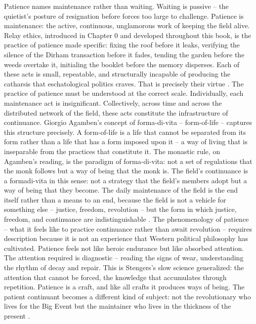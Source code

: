 Patience names maintenance rather than waiting. Waiting is passive – the quietist’s posture of resignation before forces too large to challenge. Patience is maintenance: the active, continuous, unglamorous work of keeping the field alive. Relay ethics, introduced in Chapter 0 and developed throughout this book, is the practice of patience made specific: fixing the roof before it leaks, verifying the silence of the Dirham transaction before it fades, tending the garden before the weeds overtake it, initialing the booklet before the memory disperses. Each of these acts is small, repeatable, and structurally incapable of producing the catharsis that eschatological politics craves. That is precisely their virtue \cite{stengers_2018}. The practice of patience must be understood at the correct scale. Individually, each maintenance act is insignificant. Collectively, across time and across the distributed network of the field, these acts constitute the infrastructure of continuance. Giorgio Agamben’s concept of forma-di-vita – form-of-life – captures this structure precisely. A form-of-life is a life that cannot be separated from its form rather than a life that has a form imposed upon it – a way of living that is inseparable from the practices that constitute it. The monastic rule, on Agamben’s reading, is the paradigm of forma-di-vita: not a set of regulations that the monk follows but a way of being that the monk is. The field’s continuance is a formadi-vita in this sense: not a strategy that the field’s members adopt but a way of being that they become. The daily maintenance of the field is the end itself rather than a means to an end, because the field is not a vehicle for something else – justice, freedom, revolution – but the form in which justice, freedom, and continuance are indistinguishable \cite[pp.~237-250]{agamben_2013}. The phenomenology of patience – what it feels like to practice continuance rather than await revolution – requires description because it is not an experience that Western political philosophy has cultivated. Patience feels not like heroic endurance but like absorbed attention. The attention required is diagnostic – reading the signs of wear, understanding the rhythm of decay and repair. This is Stengers’s slow science generalized: the attention that cannot be forced, the knowledge that accumulates through repetition. Patience is a craft, and like all crafts it produces ways of being. The patient continuant becomes a different kind of subject: not the revolutionary who lives for the Big Event but the maintainer who lives in the thickness of the present \cite{stengers_2018}.

